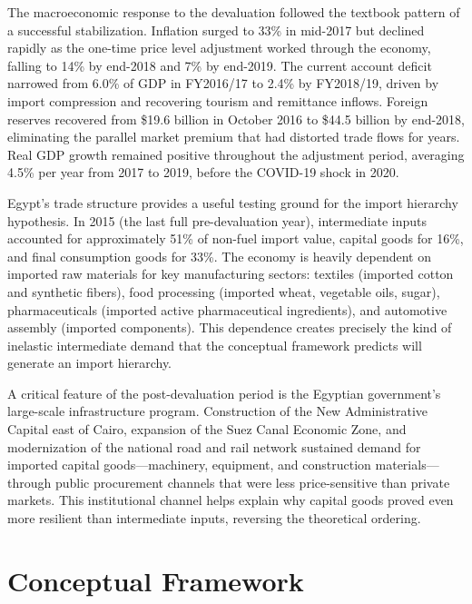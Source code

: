 \documentclass[12pt]{article}
\begin{document}
The macroeconomic response to the devaluation followed the textbook pattern of a successful stabilization. Inflation surged to 33\% in mid-2017 but declined rapidly as the one-time price level adjustment worked through the economy, falling to 14\% by end-2018 and 7\% by end-2019. The current account deficit narrowed from 6.0\% of GDP in FY2016/17 to 2.4\% by FY2018/19, driven by import compression and recovering tourism and remittance inflows. Foreign reserves recovered from \$19.6 billion in October 2016 to \$44.5 billion by end-2018, eliminating the parallel market premium that had distorted trade flows for years. Real GDP growth remained positive throughout the adjustment period, averaging 4.5\% per year from 2017 to 2019, before the COVID-19 shock in 2020.

Egypt's trade structure provides a useful testing ground for the import hierarchy hypothesis. In 2015 (the last full pre-devaluation year), intermediate inputs accounted for approximately 51\% of non-fuel import value, capital goods for 16\%, and final consumption goods for 33\%. The economy is heavily dependent on imported raw materials for key manufacturing sectors: textiles (imported cotton and synthetic fibers), food processing (imported wheat, vegetable oils, sugar), pharmaceuticals (imported active pharmaceutical ingredients), and automotive assembly (imported components). This dependence creates precisely the kind of inelastic intermediate demand that the conceptual framework predicts will generate an import hierarchy.

A critical feature of the post-devaluation period is the Egyptian government's large-scale infrastructure program. Construction of the New Administrative Capital east of Cairo, expansion of the Suez Canal Economic Zone, and modernization of the national road and rail network sustained demand for imported capital goods---machinery, equipment, and construction materials---through public procurement channels that were less price-sensitive than private markets. This institutional channel helps explain why capital goods proved even more resilient than intermediate inputs, reversing the theoretical ordering.


\section{Conceptual Framework}
\end{document}
